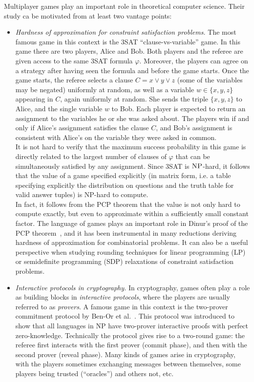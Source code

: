Multiplayer games play an important role in theoretical computer science. Their study ca be motivated from at least two vantage points: 
\begin{itemize}
\item \emph{Hardness of approximation for constraint satisfaction problems.} The most famous game in this context is the $3$SAT ``clause-vs-variable'' game. In this game there are two players, Alice and Bob. Both players and the referee are given access to the same $3$SAT formula $\varphi$. Moreover, the players can agree on a strategy after having seen the formula and before the game starts. Once the game starts, the referee selects a clause $C = x \vee y \vee z$ (some of the variables may be negated) uniformly at random, as well as a variable $w\in\{x,y,z\}$ appearing in $C$, again uniformly at random. She sends the triple $\{x,y,z\}$ to Alice, and the single variable $w$ to Bob. Each player is expected to return an assignment to the variables he or she was asked about. The players win if and only if Alice's assignment satisfies the clause $C$, and Bob's assignment is consistent with Alice's on the variable they were asked in common.\\
It is not hard to verify that the maximum success probability in this game is directly related to the largest number of clauses of $\varphi$ that can be simultaneously satisfied by any assignment. Since $3$SAT is $\textsc{NP}$-hard, it follows that the value of a game specified explicitly (in matrix form, i.e. a table specifying explicitly the distribution on questions and the truth table for valid answer tuples) is NP-hard to compute. \\
In fact, it follows from the PCP theorem that the value is not only hard to compute exactly, but even to approximate within a sufficiently small constant factor. The language of games plays an important role in 
Dinur's proof of the PCP theorem~\cite{dinur2007pcp}, and it has been instrumental in many reductions deriving hardness of approximation for combinatorial problems. It can also be a useful perspective when studying rounding techniques for linear programming (LP) or semidefinite programming (SDP) relaxations of constraint satisfaction problems. 

\item \emph{Interactive protocols in cryptography.} In cryptography, games often play a role as building blocks in \emph{interactive protocols}, where the players are usually referred to as \emph{provers}. A famous game in this context is the two-prover commitment protocol by Ben-Or et al.~\cite{ben1988multi}. This protocol was introduced to show that all languages in NP have two-prover interactive proofs with perfect zero-knowledge. Technically the protocol gives rise to a two-round game: the referee first interacts with the first prover (commit phase), and then with the second prover (reveal phase). Many kinds of games arise in cryptography, with the players sometimes exchanging messages between themselves, some players being trusted (``oracles'') and others not, etc. 
\end{itemize}


